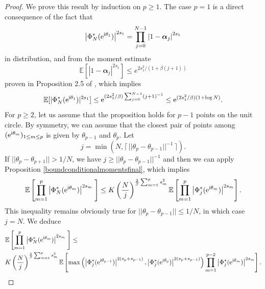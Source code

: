 \documentclass[]{article}
\begin{document}
\begin{proof}
We prove this result by induction on $p \geq 1$. 
The case $p = 1$ is a direct consequence of the fact that 
$$\left|\Phi^*_{N} (\mathrm{e}^{\textnormal{i} \theta_1})\right|^{2s_1}
= \prod_{j=0}^{N-1} \left|1 - \boldsymbol{\alpha}_j\right|^{2 s_1}$$
in distribution, and from the moment estimate
$$\mathbb{E} [|1 - \boldsymbol{\alpha}_j|^{2 s_1}] \leq e^{2s_1^2 /(1 + \beta(j+1))} $$
proven in Proposition 2.5 of \cite{ChhaibiMadauleNajnudel}, which 
implies 
$$\mathbb{E} [|\Phi^*_{N} (\mathrm{e}^{\textnormal{i} \theta_1})|^{2s_1}] \leq \mathrm{e}^{(2s_1^2/\beta) \sum_{j=0}^{N-1} (j+1)^{-1} }
\leq \mathrm{e}^{(2 s_1^2/\beta)(1 + \log N)}.
$$
For $p \geq 2$, let us assume that the proposition holds for $p-1$ points on the unit circle. 
By symmetry, we can assume that 
the closest pair of points among $(\mathrm{e}^{\textnormal{i} \theta_{m}})_{1 \leq m \leq p}$ is given by 
$\theta_{p-1}$ and $\theta_p$. 
Let
$$j = \min(N, \lceil \, ||\theta_{p} - \theta_{p-1} ||^{-1} \, \rceil).$$
If $||\theta_p - \theta_{p+1}|| > 1/N$, we have
$j \geq ||\theta_{p}- \theta_{p-1}||^{-1}$ and then we can apply Proposition \ref{boundconditionalmomentsfinal}, which implies
$$\mathbb{E} \left[ \prod_{m=1}^p \left|\Phi^*_{N} (\mathrm{e}^{\textnormal{i} \theta_m})\right|^{2s_m} \;  \right]
\leq  K \left( \frac{N}{j} \right)^{\frac{2}{\beta} \sum_{m=1}^p s_m^2}  \mathbb{E} \left[ \prod_{m=1}^p \left|\Phi^*_{j} (\mathrm{e}^{\textnormal{i} \theta_m})
\right|^{2s_m} \right].$$
This inequality remains obviously true for $||\theta_p - \theta_{p-1}|| \leq 1/N$, in which case $j =N$. 
We deduce
\begin{align*}
&\mathbb{E} \left[ \prod_{m=1}^p \left|\Phi^*_{N} (\mathrm{e}^{\textnormal{i} \theta_m})\right|^{2s_m} \;  \right]
\leq \\
&K \left( \frac{N}{j} \right)^{\frac{2}{\beta} \sum_{m=1}^p s_m^2}  \mathbb{E} \left[ 
\max\left(\left|\Phi^*_{j} (\mathrm{e}^{\textnormal{i} \theta_{p-1}}) \right|^{2(s_p + s_{p-1})}, \left|\Phi^*_{j} (\mathrm{e}^{\textnormal{i} \theta_{p}}) \right|^{2(s_p + s_{p-1})}\right) \prod_{m=1}^{p-2} \left|\Phi^*_{j} (\mathrm{e}^{\textnormal{i} \theta_m})
\right|^{2s_m} \right].
\end{align*}


\end{proof}
\end{document}
